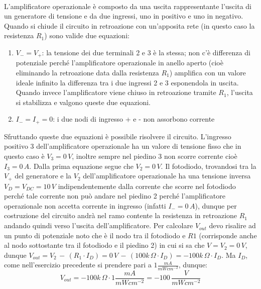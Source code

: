 \documentclass[12pt, a4paper]{report}
\begin{document}
\begin{appendices}
\begin{enumerate}
\begin{figure}[h]
    \end{figure}
    \\L'amplificatore operazionale è composto da una uscita rappresentante l'uscita di un generatore di tensione e da due ingressi, uno in positivo e uno in negativo. Quando si chiude il circuito in retroazione con un'apposita rete (in questo caso la resistenza $R_1$) sono valide due equazioni:
    \begin{enumerate}
        \item $V_{-} = V_{+}$: la tensione dei due terminali 2 e 3 è la stessa; non c'è differenza di potenziale perché l'amplificatore operazionale in anello aperto (cioè eliminando la retroazione data dalla resistenza $R_1$) amplifica con un valore ideale infinito la differenza tra i due ingressi 2 e 3 esponendola in uscita. Quando invece l'amplificatore viene chiuso in retroazione tramite $R_1$, l'uscita si stabilizza e valgono queste due equazioni.
        \item $I_{-} = I_{+} = 0$: i due nodi di ingresso + e - non assorbono corrente
    \end{enumerate}
    Sfruttando queste due equazioni è possibile risolvere il circuito. L'ingresso positivo 3 dell'amplificatore operazionale ha un valore di tensione fisso che in questo caso è $V_{3} = 0\,V$, inoltre sempre nel piedino 3 non scorre corrente cioè $I_{3} = 0\,A$. Dalla prima equazione segue che $V_{2} = 0\,V$. Il fotodiodo, trovandosi tra la $V_{+}$ del generatore e la $V_{2}$ dell'amplificatore operazionale ha una tensione inversa $V_{D} = V_{DC} = 10\,V$ indipendentemente dalla corrente che scorre nel fotodiodo perché tale corrente non può andare nel piedino 2 perché l'amplificatore operazionale non accetta corrente in ingresso (infatti $I_{-} = 0\,A$), dunque per costruzione del circuito andrà nel ramo contente la resistenza in retroazione $R_1$ andando quindi verso l'uscita dell'amplificatore. Per calcolare $V_{out}$ devo risalire ad un punto di potenziale noto che è il nodo tra il fotodiodo e $R1$ (corrisponde anche al nodo sottostante tra il fotodiodo e il piedino 2) in cui si sa che $V = V_{2} = 0\,V$, dunque $V_{out} = V_{2} \,-\, ( R_1 \cdot I_{D}) = 0\,V \,-\, (100k\,\Omega \cdot I_{D}) = - 100k\,\Omega \cdot I_{D}$. Ma $I_{D}$, come nell'esercizio precedente si prendere pari a $1 \frac{mA}{mWcm^{-2}}$, dunque:
    \begin{equation*}
        V_{out} = - 100k\,\Omega \cdot 1 \frac{mA}{mWcm^{-2}} = - 100\,\frac{V}{mWcm^{-2}}
    \end{equation*}

\end{enumerate}
\end{appendices}
\end{document}
